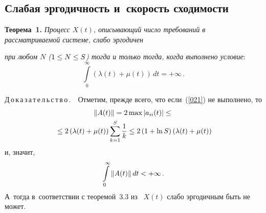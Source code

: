 \begin{multicols}{2}
\section{Слабая эргодичность и~скорость сходимости}

\noindent
\textbf{Теорема~1.} \textit{Процесс $X(t)$,
описывающий число требований в рассматриваемой сис\-те\-ме,
слабо эргодичен}\linebreak\vspace*{-12pt}
\columnbreak

\noindent
\textit{при любом $N$ ($1 \hm\le N \hm\le S$)
тогда и только тогда, когда выполнено условие}:
\begin{equation}
\int\limits_0^\infty \left(\lambda(t) + \mu(t) \right)\, dt = + \infty\,.
\label{021}
\end{equation}


\noindent
Д\,о\,к\,а\,з\,а\,т\,е\,л\,ь\,с\,т\,в\,о\,.\ \
Отметим, прежде всего, что если~(\ref{021}) не выполнено, то
\begin{multline*}
\|A(t)\| \hm= 2 \max |a_{ii}(t)| \le {}\\
{}\le 2\left(
\lambda(t)+\mu(t)\right)\sum\limits_{k=1}^S\fr{1}{k} \le
2\left(1+\ln S\right)\left(\lambda(t)+ \mu(t)\right)
\end{multline*}
 и, значит,
$$
\int\limits_0^\infty  \|A(t)\|\, dt \hm< + \infty\,.
$$
А~тогда
в~соответствии с теоремой~3.3 из~\cite{z94}
 $X(t)$ слабо эргодичным быть не может.


\end{multicols}
